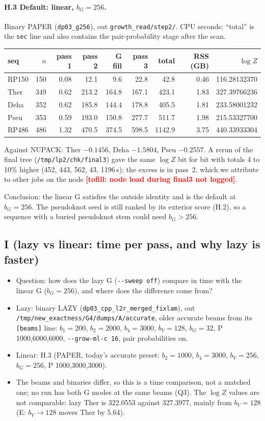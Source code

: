 \documentclass[11pt]{article}
\newcommand{\tofill}[1]{\textcolor{red}{\textbf{[tofill: #1]}}}
\begin{document}
\paragraph{H.3 Default: linear, $b_G=256$.} Binary PAPER (\texttt{dp03\_g256}), out \texttt{growth\_read/step2/}. CPU seconds; ``total'' is the \texttt{sec} line and also contains the pair-probability stage after the scan.
\begin{center}
\small
\begin{tabular}{@{}lrrrrrrrr@{}}
\toprule
seq & $n$ & pass 1 & pass 2 & G fill & pass 3 & total & RSS (GB) & $\log Z$ \\
\midrule
RP150 & 150 & 0.08 & 12.1 & 9.6 & 22.8 & 42.8 & 0.46 & 116.28132370 \\
Ther & 349 & 0.62 & 213.2 & 164.8 & 167.1 & 423.1 & 1.83 & 327.39766236 \\
Deha & 352 & 0.62 & 185.8 & 144.4 & 178.8 & 405.5 & 1.81 & 233.58001232 \\
Pseu & 353 & 0.59 & 193.0 & 150.8 & 277.7 & 511.7 & 1.98 & 215.53327700 \\
RP486 & 486 & 1.32 & 470.5 & 374.5 & 598.5 & 1142.9 & 3.75 & 440.33933304 \\
\bottomrule
\end{tabular}
\end{center}
Against NUPACK: Ther $-0.1456$, Deha $-1.5804$, Pseu $-0.2557$. A rerun of the final tree (\texttt{/tmp/lp2/chk/final3}) gave the same $\log Z$ bit for bit with totals 4 to 10\% higher (452, 443, 562, 43, 1196\,s); the excess is in pass~2, which we attribute to other jobs on the node \tofill{node load during final3 not logged}.

Conclusion: the linear G satisfies the outside identity and is the default at $b_G=256$. The pseudoknot seed is still ranked by its exterior score (H.2), so a sequence with a buried pseudoknot stem could need $b_G>256$.

\subsection{I (lazy vs linear: time per pass, and why lazy is faster)}
\begin{itemize}[leftmargin=*]
  \item Question: how does the lazy G (\texttt{-{}-sweep off}) compare in time with the linear G ($b_G=256$), and where does the difference come from?
  \item Lazy: binary LAZY (\texttt{dp03\_cpp\_l2r\_merged\_fixlam}), out \texttt{/tmp/new\_exactness/}\allowbreak\texttt{G4/dumps/A/accurate}, older accurate beams from its \texttt{[beams]} line: $b_1=200$, $b_2=2000$, $b_4=3000$, $b_V=128$, $b_G=32$, P 1000,6000,6000, \texttt{-{}-grow-ml-c 16}, pair probabilities on.
  \item Linear: H.3 (PAPER, today's accurate preset: $b_2=1000$, $b_4=3000$, $b_V=256$, $b_G=256$, P 1000,3000,3000).
  \item The beams and binaries differ, so this is a time comparison, not a matched one; no run has both G modes at the same beams (Q3). The $\log Z$ values are not comparable: lazy Ther is 322.0553 against 327.3977, mainly from $b_V=128$ (E: $b_V\to128$ moves Ther by 5.64).
\end{itemize}
\end{document}
